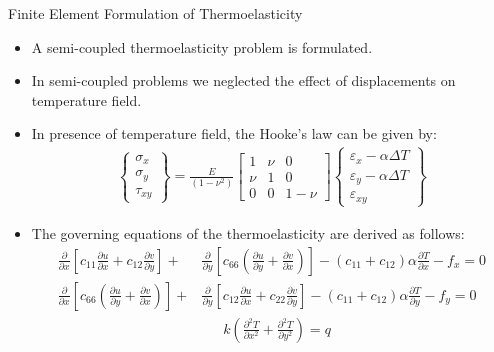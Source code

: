 \documentclass{beamer}
\begin{document}
\begin{frame}[t,fragile]{Finite Element Formulation of Thermoelasticity}
    \vspace{-.4cm}
    \begin{itemize}      
\item A semi-coupled thermoelasticity problem is formulated.      
\item In semi-coupled problems we neglected the effect of displacements on temperature field.      
\item In presence of temperature field, the Hooke's law can be given by: 
    \footnotesize
\begin{align*}
    \begin{Bmatrix}
        \sigma_{x}\\ \sigma_{y}\\ \tau_{xy} 
    \end{Bmatrix} =\frac{E}{(1-\nu^2)}
    \begin{bmatrix}
        1 & \nu & 0 \\ \nu & 1 & 0 \\ 0 & 0 & 1-\nu 
    \end{bmatrix}
    \begin{Bmatrix}
        \varepsilon_{x}-\alpha\Delta T \\ \varepsilon_{y}-\alpha \Delta T \\ \varepsilon_{xy} 
    \end{Bmatrix}
\end{align*}
     
    \item The governing equations of the thermoelasticity are derived as follows: 
            \bgroup
            \begin{align*}
    \frac{\partial}{\partial x}\left[c_{11}\frac{\partial u}{\partial x}+c_{12}\frac{\partial v}{\partial y}\right]+&\frac{\partial}{\partial y}\left[c_{66}\left(\frac{\partial u}{\partial y}+\frac{\partial v}{\partial x}\right)\right]-(c_{11}+c_{12})\alpha\frac{\partial T}{\partial x}-f_x   =0 \\
    \frac{\partial}{\partial x}\left[c_{66}\left(\frac{\partial u}{\partial y}+\frac{\partial v}{\partial x}\right)\right]+&\frac{\partial}{\partial y}\left[c_{12}\frac{\partial u}{\partial x}+c_{22}\frac{\partial v}{\partial y}\right]-(c_{11}+c_{12})\alpha\frac{\partial T}{\partial y}-f_y=0\\
    &\ \ \ \ \ \ \ k\left( \frac{\partial^2 T}{\partial x^2}+\frac{\partial^2 T}{\partial y^2} \right)=q
\end{align*}
\egroup
       \end{itemize}
\end{frame}
\end{document}
